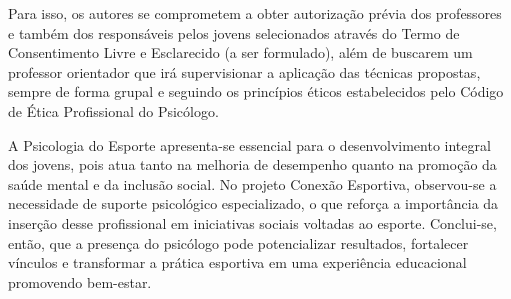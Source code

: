 \begin{Desenvolvimento}
Para isso, os autores se comprometem a obter autorização prévia dos professores e também dos responsáveis pelos jovens selecionados através do Termo de Consentimento Livre e Esclarecido (a ser formulado), além de buscarem um professor orientador que irá supervisionar a aplicação das técnicas propostas, sempre de forma grupal e seguindo os princípios éticos estabelecidos pelo Código de Ética Profissional do Psicólogo.

A Psicologia do Esporte apresenta-se essencial para o desenvolvimento integral dos jovens, pois atua tanto na melhoria de desempenho quanto na promoção da saúde mental e da inclusão social. No projeto Conexão Esportiva, observou-se a necessidade de suporte psicológico especializado, o que reforça a importância da inserção desse profissional em iniciativas sociais voltadas ao esporte. Conclui-se, então, que a presença do psicólogo pode potencializar resultados, fortalecer vínculos e transformar a prática esportiva em uma experiência educacional promovendo bem-estar.

\end{Desenvolvimento}


